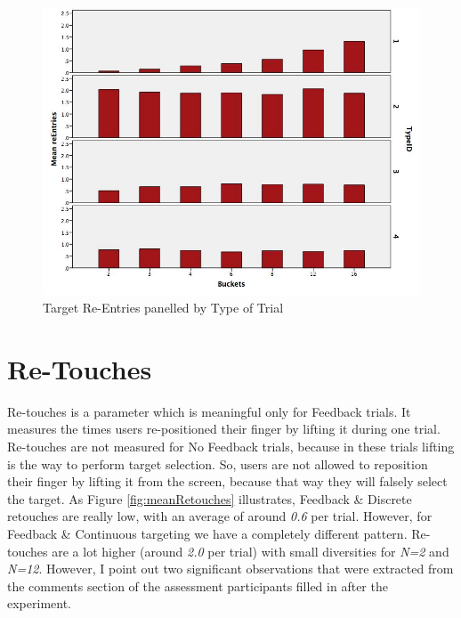 \begin{figure}[H]
\centering
\includegraphics[scale=0.4]{figures/meanReentries}
\caption{Target Re-Entries panelled by Type of Trial}
\label{fig:meanReentries}
\end{figure}


\section{Re-Touches}
\label{resultsReTouches}

Re-touches is a parameter which is meaningful only for Feedback trials. It measures the times users re-positioned their finger by lifting it during one trial. Re-touches are not measured for No Feedback trials,  because in these trials lifting is the way to perform target selection. So, users are not allowed to reposition their finger by lifting it from the screen, because that way they will falsely select the target.
As Figure \ref{fig:meanRetouches} illustrates, Feedback \& Discrete retouches are really low, with an average of around \emph{0.6} per trial. However, for Feedback \& Continuous targeting we have a completely different pattern. Re-touches are a lot higher (around \emph{2.0} per trial) with small diversities for \emph{N=2} and \emph{N=12}. However, I point out two significant observations that were extracted from the comments section of the assessment participants filled in after the experiment.

